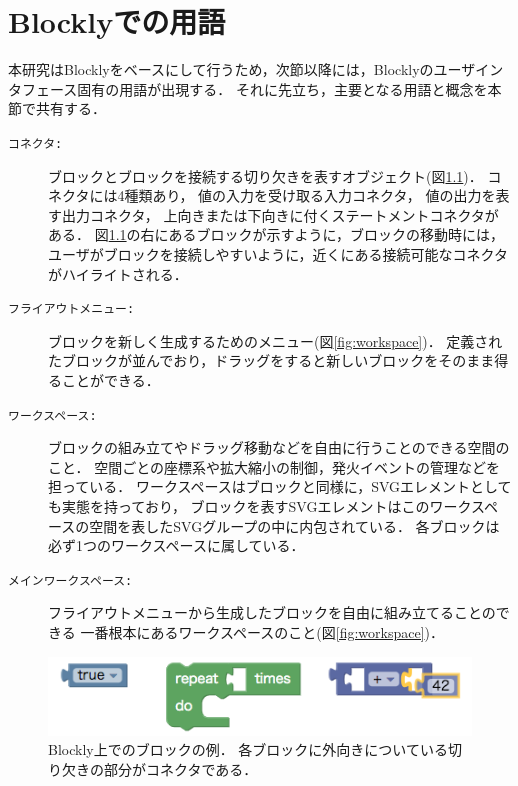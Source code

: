 \chapter{Blocklyでの用語}\label{chap:blocklyWord}

本研究はBlocklyをベースにして行うため，次節以降には，Blocklyのユーザインタフェース固有の用語が出現する．
それに先立ち，主要となる用語と概念を本節で共有する．

\begin{description}
 \item[{\tt コネクタ:}]
ブロックとブロックを接続する切り欠きを表すオブジェクト(図\ref{fig:connector})．
コネクタには4種類あり，
値の入力を受け取る入力コネクタ，
値の出力を表す出力コネクタ，
上向きまたは下向きに付くステートメントコネクタがある．
図\ref{fig:connector}の右にあるブロックが示すように，ブロックの移動時には，
ユーザがブロックを接続しやすいように，近くにある接続可能なコネクタがハイライトされる．

 \item[{\tt フライアウトメニュー:}]
ブロックを新しく生成するためのメニュー(図\ref{fig:workspace})．
定義されたブロックが並んでおり，ドラッグをすると新しいブロックをそのまま得ることができる．

 \item[{\tt ワークスペース:}]
ブロックの組み立てやドラッグ移動などを自由に行うことのできる空間のこと．
空間ごとの座標系や拡大縮小の制御，発火イベントの管理などを担っている．
ワークスペースはブロックと同様に，SVGエレメントとしても実態を持っており，
ブロックを表すSVGエレメントはこのワークスペースの空間を表したSVGグループの中に内包されている．
各ブロックは必ず1つのワークスペースに属している．

 \item[{\tt メインワークスペース:}]
フライアウトメニューから生成したブロックを自由に組み立てることのできる
一番根本にあるワークスペースのこと(図\ref{fig:workspace})．

\end{description}

\begin{figure}[h]
 \centering
 \includegraphics[keepaspectratio, scale=0.5]{img/connector.png}
 \caption{Blockly上でのブロックの例．
各ブロックに外向きについている切り欠きの部分がコネクタである．\label{fig:connector}}
\end{figure}

